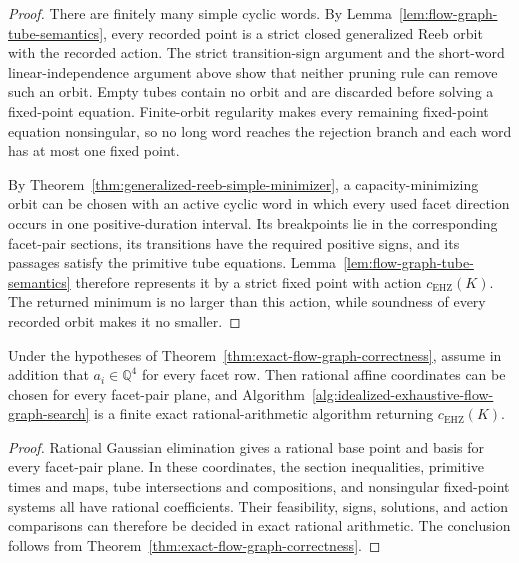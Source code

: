\begin{proof}
There are finitely many simple cyclic words.  By
Lemma~\ref{lem:flow-graph-tube-semantics}, every recorded point is a strict
closed generalized Reeb orbit with the recorded action.  The strict
transition-sign argument and the short-word linear-independence argument above
show that neither pruning rule can remove such an orbit.  Empty tubes contain
no orbit and are discarded before
solving a fixed-point equation. Finite-orbit regularity makes every remaining
fixed-point equation nonsingular, so no long word reaches the rejection
branch and each word has at most one fixed point.

By Theorem~\ref{thm:generalized-reeb-simple-minimizer}, a capacity-minimizing
orbit can be chosen with an active cyclic word in which every used facet
direction occurs in one positive-duration interval.  Its breakpoints lie in
the corresponding facet-pair sections, its transitions have the required
positive signs, and its passages satisfy the primitive tube equations.
Lemma~\ref{lem:flow-graph-tube-semantics} therefore represents it by a strict
fixed point with action \(c_{\mathrm{EHZ}}(K)\).  The returned minimum is no
larger than this action, while soundness of every recorded orbit makes it no
smaller.
\end{proof}

\begin{corollary}
\label{cor:rational-flow-graph-correctness}
Under the hypotheses of
Theorem~\ref{thm:exact-flow-graph-correctness}, assume in addition that
\(a_i\in\mathbb Q^4\) for every facet row.  Then rational affine coordinates
can be chosen for every facet-pair plane, and
Algorithm~\ref{alg:idealized-exhaustive-flow-graph-search} is a finite exact
rational-arithmetic algorithm returning \(c_{\mathrm{EHZ}}(K)\).
\end{corollary}

\begin{proof}
Rational Gaussian elimination gives a rational base point and basis for every
facet-pair plane.  In these coordinates, the section inequalities, primitive
times and maps, tube intersections and compositions, and nonsingular
fixed-point systems all have rational coefficients.  Their feasibility, signs,
solutions, and action comparisons can therefore be decided in exact rational
arithmetic.  The conclusion follows from
Theorem~\ref{thm:exact-flow-graph-correctness}.
\end{proof}

